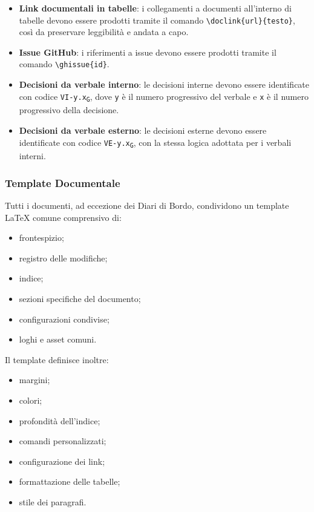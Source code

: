 \begin{itemize}
    \item \textbf{Link documentali in tabelle}: i collegamenti a documenti all'interno
    di tabelle devono essere prodotti tramite il comando
    \verb|\doclink{url}{testo}|, così da preservare leggibilità e andata a capo.

    \item \textbf{Issue GitHub}: i riferimenti a issue devono essere prodotti tramite
    il comando \verb|\ghissue{id}|.

    \item \textbf{Decisioni da verbale interno}: le decisioni interne devono essere
    identificate con codice \texttt{VI-y.x\textsubscript{G}}, dove \texttt{y} è il numero progressivo
    del verbale e \texttt{x} è il numero progressivo della decisione.

    \item \textbf{Decisioni da verbale esterno}: le decisioni esterne devono essere
    identificate con codice \texttt{VE-y.x\textsubscript{G}}, con la stessa logica adottata per i
    verbali interni.
\end{itemize}


\subsubsection{Template Documentale}

Tutti i documenti, ad eccezione dei Diari di Bordo, condividono un template
\LaTeX{} comune comprensivo di:

\begin{itemize}
    \item frontespizio;
    \item registro delle modifiche;
    \item indice;
    \item sezioni specifiche del documento;
    \item configurazioni condivise;
    \item loghi e asset comuni.
\end{itemize}

Il template definisce inoltre:
\begin{itemize}
    \item margini;
    \item colori;
    \item profondità dell'indice;
    \item comandi personalizzati;
    \item configurazione dei link;
    \item formattazione delle tabelle;
    \item stile dei paragrafi.
\end{itemize}

